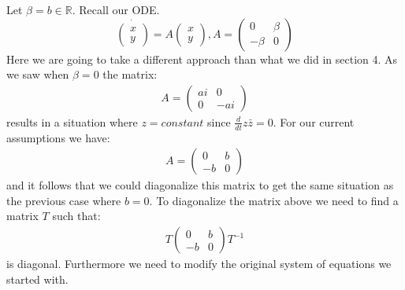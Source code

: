 \documentclass[10pt]{article}
\begin{document}
Let $\beta=b\in\mathbb R$.
Recall our ODE.
$$\dot{\begin{pmatrix}x\\y\end{pmatrix}}=A{\begin{pmatrix}x\\y\end{pmatrix}}, A=\begin{pmatrix}0&\beta\\-\beta&0\end{pmatrix}$$
Here we are going to take a different approach than what we did in section 4. As we saw when $\beta=0$ the matrix:
\begin{align*}
A = \begin{pmatrix}ai&0\\0&-ai\end{pmatrix}
\end{align*}
results in a situation where $z = constant$ since $\frac{d}{dt} z\bar{z} = 0$. For our current assumptions we have:
\begin{align*}
A = \begin{pmatrix}0&b\\-b&0\end{pmatrix}
\end{align*}
and it follows that we could diagonalize this matrix to get the same situation as the previous case where $b = 0$. To diagonalize the matrix above we need to find a matrix $T$ such that:
\begin{align*}
T\begin{pmatrix}0&b\\-b&0\end{pmatrix}T^{-1}
\end{align*}
is diagonal. Furthermore we need to modify the original system of equations we started with.
\end{document}
